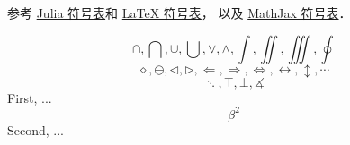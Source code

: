 
参考 \href{https://docs.julialang.org/en/v1/manual/unicode-input/}{Julia 符号表}和 \href{https://oeis.org/wiki/List_of_LaTeX_mathematical_symbols}{LaTeX 符号表}， 以及 \href{http://www.onemathematicalcat.org/MathJaxDocumentation/TeXSyntax.htm#U}{MathJax 符号表}．

\begin{equation}
\cap, \bigcap, \cup, \bigcup, \vee, \wedge, \int, \iint, \iiint, \oint
\end{equation}
\begin{equation}
\diamond, \ominus, \triangleleft, \triangleright, \Longleftarrow, \Longrightarrow, \iff, \leftrightarrow, \updownarrow, \cdots
\end{equation}
\begin{equation}
\ddots, \top, \bot, \measuredangle
\end{equation}
First, ... 
\begin{equation}\label{test_eq1}
\beta^2
\end{equation}
Second, ...